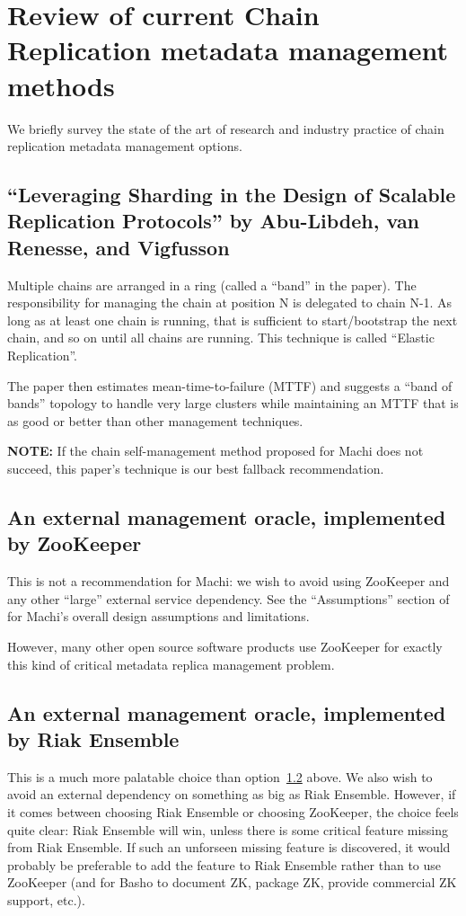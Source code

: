 \documentclass[preprint,10pt]{sigplanconf}
\begin{document}
\section{Review of current Chain Replication metadata management methods}
\label{sec:cr-management-review}

We briefly survey the state of the art of research and industry
practice of chain replication metadata management options.

\subsection{``Leveraging Sharding in the Design of Scalable Replication Protocols'' by Abu-Libdeh, van Renesse, and Vigfusson}
\label{ssec:elastic-replication}
Multiple chains are arranged in a ring (called a ``band'' in the paper).
The responsibility for managing the chain at position N is delegated
to chain N-1.  As long as at least one chain is running, that is
sufficient to start/bootstrap the next chain, and so on until all
chains are running.  This technique is called ``Elastic Replication''.

The paper then estimates mean-time-to-failure
(MTTF) and suggests a ``band of bands'' topology to handle very large
clusters while maintaining an MTTF that is as good or better than
other management techniques.

{\bf NOTE:} If the chain self-management method proposed for Machi does not
succeed, this paper's technique is our best fallback recommendation.

\subsection{An external management oracle, implemented by ZooKeeper}
\label{ssec:an-oracle}
This is not a recommendation for Machi: we wish to avoid using
ZooKeeper and any other ``large'' external service dependency.  See
the ``Assumptions'' section of \cite{machi-design} for Machi's overall
design assumptions and limitations.

However, many other open source software products use ZooKeeper for
exactly this kind of critical metadata replica management problem.

\subsection{An external management oracle, implemented by Riak Ensemble}

This is a much more palatable choice than option~\ref{ssec:an-oracle}
above.  We also
wish to avoid an external dependency on something as big as Riak
Ensemble.  However, if it comes between choosing Riak Ensemble or
choosing ZooKeeper, the choice feels quite clear: Riak Ensemble will
win, unless there is some critical feature missing from Riak
Ensemble.  If such an unforseen missing feature is discovered, it
would probably be preferable to add the feature to Riak Ensemble
rather than to use ZooKeeper (and for Basho to document ZK, package
ZK, provide commercial ZK support, etc.).
\end{document}
